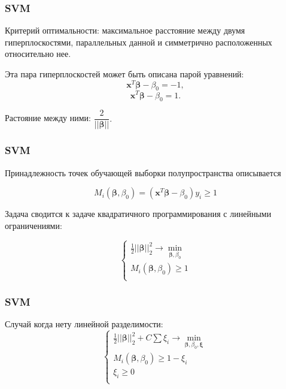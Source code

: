 \documentclass[11pt]{beamer}
\begin{document}
	\begin{frame}
		\frametitle{SVM}
		
		Критерий оптимальности: максимальное расстояние между двумя гиперплоскостями, параллельных данной и симметрично расположенных относительно нее.
		
		\bigskip 
		
		Эта пара гиперплоскостей может быть описана парой уравнений:
		$$ \bm{x}^T \bm{\beta} - \beta_0 = -1, $$
		$$ \bm{x}^T \bm{\beta} - \beta_0 = 1. $$
		
		\bigskip 
		
		Растояние между ними: $ \dfrac{2}{||\bm{\beta}||}. $
	\end{frame}

	\begin{frame}
		\frametitle{SVM}
		Принадлежность точек обучающей выборки полупространства описывается
		
		$$ M_i (\bm{\beta}, \beta_0) = (\bm{x}^T \bm{\beta} -  \beta_0) y_i \geqslant 1 $$
		
		Задача сводится к задаче квадратичного программирования с линейными ограничениями:
		
		 $$
			 \begin{cases}
			 	\frac{1}{2}||\bm{\beta}||_2^2\rightarrow \min\limits_{\bm{\beta},\beta_0} \\
			 	M_i (\bm{\beta}, \beta_0) \geqslant 1 \\
			 \end{cases}
		 $$
	
	\end{frame}

	\begin{frame}
	\frametitle{SVM}
		Случай когда нету линейной разделимости:
		$$
		\begin{cases}
			\frac{1}{2}||\bm{\beta}||_2^2 + C \sum \xi_i \rightarrow \min\limits_{\bm{\beta},\beta_0, \bm{\xi}} \\
			M_i (\bm{\beta}, \beta_0) \geqslant 1 - \xi_i \\
			\xi_i \geqslant 0 \\
		\end{cases}
		$$
	
	\end{frame}
\end{document}
